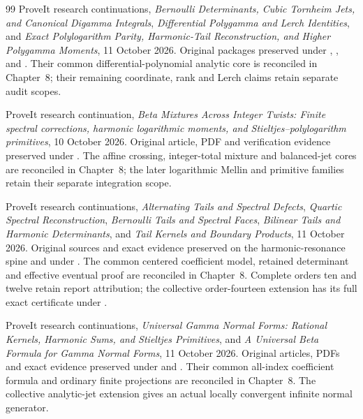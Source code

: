 \begin{thebibliography}{99}
ProveIt research continuations, \emph{Bernoulli Determinants, Cubic Tornheim
Jets, and Canonical Digamma Integrals}, \emph{Differential Polygamma and
Lerch Identities}, and \emph{Exact Polylogarithm Parity, Harmonic-Tail
Reconstruction, and Higher Polygamma Moments}, 11 October 2026.
Original packages preserved under
,
,
and .
Their common differential-polynomial analytic core is reconciled in
Chapter~8; their remaining coordinate, rank and Lerch
claims retain separate audit scopes.

ProveIt research continuation, \emph{Beta Mixtures Across Integer Twists:
Finite spectral corrections, harmonic logarithmic moments, and
Stieltjes--polylogarithm primitives}, 10 October 2026.
Original article, PDF and verification evidence preserved under
.
The affine crossing, integer-total mixture and balanced-jet cores are
reconciled in Chapter~8; the later logarithmic Mellin and primitive
families retain their separate integration scope.


ProveIt research continuations, \emph{Alternating Tails and Spectral Defects},
\emph{Quartic Spectral Reconstruction}, \emph{Bernoulli Tails and Spectral Faces},
\emph{Bilinear Tails and Harmonic Determinants}, and
\emph{Tail Kernels and Boundary Products}, 11 October 2026.
Original sources and exact evidence preserved on the harmonic-resonance
spine and under .
The common centered coefficient model, retained determinant and effective
eventual proof are reconciled in Chapter~8. Complete orders ten and twelve
retain report attribution; the collective order-fourteen extension has
its full exact certificate under .

ProveIt research continuations, \emph{Universal Gamma Normal Forms:
Rational Kernels, Harmonic Sums, and Stieltjes Primitives}, and
\emph{A Universal Beta Formula for Gamma Normal Forms}, 11 October 2026.
Original articles, PDFs and exact evidence preserved under
and .
Their common all-index coefficient formula and ordinary finite projections
are reconciled in Chapter~8. The collective analytic-jet extension gives
an actual locally convergent infinite normal generator.


\end{thebibliography}
